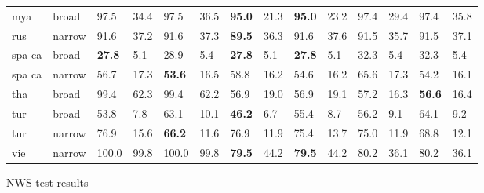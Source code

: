 \begin{center}
{\begin{tabularx}{1.3\textwidth}{|Xl||ll||ll||ll||ll||ll||ll|}
mya                & broad         & 97.5               & 34.4             & 97.5               & 36.5              & \textbf{95.0}       & 21.3              & \textbf{95.0}       & 23.2               & 97.4              & 29.4             & 97.4               & 35.8             \\
rus                & narrow        & 91.6               & 37.2             & 91.6               & 37.3              & \textbf{89.5}       & 36.3              & 91.6                & 37.6               & 91.5              & 35.7             & 91.5               & 37.1             \\
spa ca             & broad         & \textbf{27.8}      & 5.1              & 28.9               & 5.4               & \textbf{27.8}       & 5.1               & \textbf{27.8}       & 5.1                & 32.3              & 5.4              & 32.3               & 5.4              \\
spa ca             & narrow        & 56.7               & 17.3             & \textbf{53.6}      & 16.5              & 58.8                & 16.2              & 54.6                & 16.2               & 65.6              & 17.3             & 54.2               & 16.1             \\
tha                & broad         & 99.4               & 62.3             & 99.4               & 62.2              & 56.9                & 19.0              & 56.9                & 19.1               & 57.2              & 16.3             & \textbf{56.6}      & 16.4             \\
tur                & broad         & 53.8               & 7.8              & 63.1               & 10.1              & \textbf{46.2}       & 6.7               & 55.4                & 8.7                & 56.2              & 9.1              & 64.1               & 9.2              \\
tur                & narrow        & 76.9               & 15.6             & \textbf{66.2}      & 11.6              & 76.9                & 11.9              & 75.4                & 13.7               & 75.0              & 11.9             & 68.8               & 12.1             \\
vie                & narrow        & 100.0              & 99.8             & 100.0              & 99.8              & \textbf{79.5}       & 44.2              & \textbf{79.5}       & 44.2               & 80.2              & 36.1             & 80.2               & 36.1  \\
\hline   

\end{tabularx}
}{NWS test results} 

\end{center}  


